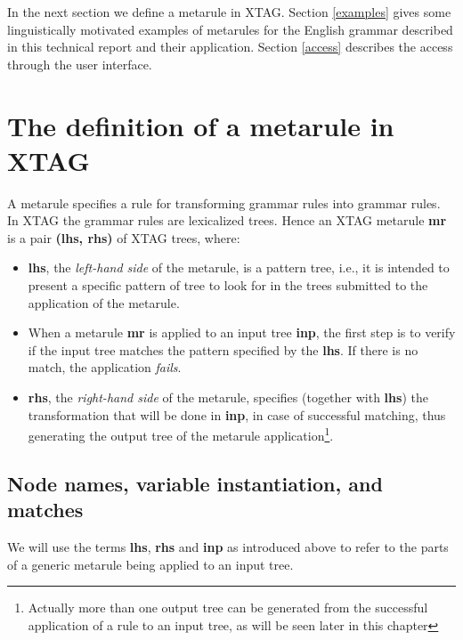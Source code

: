 In the next section we define a metarule in XTAG. 
Section \ref{examples} gives some
linguistically motivated examples
of metarules for the English grammar described in this
technical report and their application. Section \ref{access} 
describes the access through 
the user interface.

\section{The definition of a metarule in XTAG}
\label{definition}

A metarule specifies a rule for transforming grammar rules into grammar rules. 
In XTAG the grammar 
rules are lexicalized trees. Hence an XTAG metarule {\bf mr} 
is a pair {\bf (lhs, rhs)} of XTAG trees, where:

\begin{itemize}
\item {\bf lhs}, the {\it left-hand side} of the metarule, is a pattern tree,
        i.e., it is intended to present a specific pattern of tree to look for
        in the trees submitted to the application of the metarule.

\item When a metarule {\bf mr} is applied to an input tree {\bf inp}, the first
        step is to verify if the input tree matches the pattern specified by
        the {\bf lhs}. If there is no match, the application {\it fails}.

\item {\bf rhs}, the {\it right-hand side} of the metarule, specifies (together
        with {\bf lhs}) the transformation that will be done in {\bf inp},
        in case of successful matching, thus generating the output tree of
        the metarule application\footnote{Actually more than one output tree 
        can be generated from the successful application of a rule to an 
        input tree, as will be seen later in this chapter}.
\end{itemize}
 
\subsection{Node names, variable instantiation, and matches}

We will use the terms {\bf lhs}, {\bf rhs} and {\bf inp} as introduced above
to refer to the parts of a generic metarule being applied to an input tree. 

